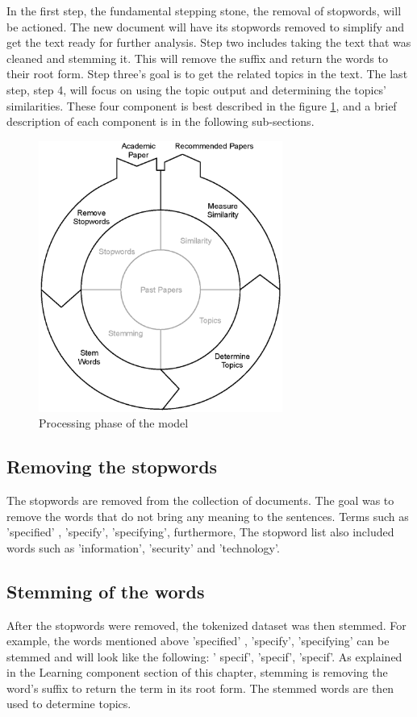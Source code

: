 In the first step, the fundamental stepping stone, the removal of stopwords, will be actioned. The new document will have its stopwords removed to simplify and get the text ready for further analysis. Step two includes taking the text that was cleaned and stemming it. This will remove the suffix and return the words to their root form. Step three's goal is to get the related topics in the text. The last step, step 4, will focus on using the topic output and determining the topics' similarities. These four component is best described in the figure \ref{fig:processing}, and a brief description of each component is in the following sub-sections.
\begin{figure}[htbp]
\centering
\includegraphics[width=8cm]{./figures/processing1.eps}
\caption{Processing phase of the model}
\label{fig:processing}
\end{figure}
\subsection{Removing the stopwords}
The stopwords are removed from the collection of documents. The goal was to remove the words that do not bring any meaning to the sentences. Terms such as 'specified' , 'specify', 'specifying', furthermore, The stopword list also included words such as 'information', 'security' and 'technology'.
\subsection{Stemming of the words}
After the stopwords were removed, the tokenized dataset was then stemmed. For example, the words mentioned above 'specified' , 'specify', 'specifying' can be stemmed and will look like the following: ' specif', 'specif', 'specif'. As explained in the Learning component section of this chapter, stemming is removing the word's suffix to return the term in its root form. The stemmed words are then used to determine topics.

